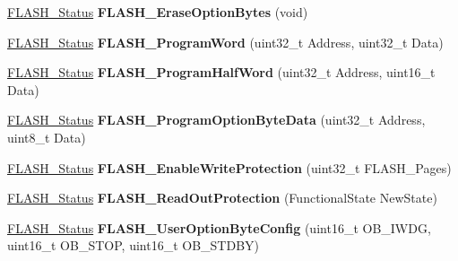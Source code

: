 \begin{DoxyCompactItemize}
\item 
\hypertarget{group__FLASH__Exported__Functions_ga152768609e85d74a9d8474be8dc2874b}{
\hyperlink{group__FLASH__Exported__Types_gadc63a6f3404ff1f71229a66915e9cdc0}{FLASH\_\-Status} {\bfseries FLASH\_\-EraseOptionBytes} (void)}
\label{group__FLASH__Exported__Functions_ga152768609e85d74a9d8474be8dc2874b}

\item 
\hypertarget{group__FLASH__Exported__Functions_gaac9a2f400b92537bd42a6bd7cc237b11}{
\hyperlink{group__FLASH__Exported__Types_gadc63a6f3404ff1f71229a66915e9cdc0}{FLASH\_\-Status} {\bfseries FLASH\_\-ProgramWord} (uint32\_\-t Address, uint32\_\-t Data)}
\label{group__FLASH__Exported__Functions_gaac9a2f400b92537bd42a6bd7cc237b11}

\item 
\hypertarget{group__FLASH__Exported__Functions_ga5c1336f667950a8765887228f1d0d501}{
\hyperlink{group__FLASH__Exported__Types_gadc63a6f3404ff1f71229a66915e9cdc0}{FLASH\_\-Status} {\bfseries FLASH\_\-ProgramHalfWord} (uint32\_\-t Address, uint16\_\-t Data)}
\label{group__FLASH__Exported__Functions_ga5c1336f667950a8765887228f1d0d501}

\item 
\hypertarget{group__FLASH__Exported__Functions_ga1382ff9d4ded8a5c076fde4fff529d21}{
\hyperlink{group__FLASH__Exported__Types_gadc63a6f3404ff1f71229a66915e9cdc0}{FLASH\_\-Status} {\bfseries FLASH\_\-ProgramOptionByteData} (uint32\_\-t Address, uint8\_\-t Data)}
\label{group__FLASH__Exported__Functions_ga1382ff9d4ded8a5c076fde4fff529d21}

\item 
\hypertarget{group__FLASH__Exported__Functions_gabad10c15e2d1ff1cb9e1083d08a9e763}{
\hyperlink{group__FLASH__Exported__Types_gadc63a6f3404ff1f71229a66915e9cdc0}{FLASH\_\-Status} {\bfseries FLASH\_\-EnableWriteProtection} (uint32\_\-t FLASH\_\-Pages)}
\label{group__FLASH__Exported__Functions_gabad10c15e2d1ff1cb9e1083d08a9e763}

\item 
\hypertarget{group__FLASH__Exported__Functions_ga0b8d1a8277950c890bbc247bbeafb40f}{
\hyperlink{group__FLASH__Exported__Types_gadc63a6f3404ff1f71229a66915e9cdc0}{FLASH\_\-Status} {\bfseries FLASH\_\-ReadOutProtection} (FunctionalState NewState)}
\label{group__FLASH__Exported__Functions_ga0b8d1a8277950c890bbc247bbeafb40f}

\item 
\hypertarget{group__FLASH__Exported__Functions_gaae1c493bb06c930ceb84dedfdb7325f6}{
\hyperlink{group__FLASH__Exported__Types_gadc63a6f3404ff1f71229a66915e9cdc0}{FLASH\_\-Status} {\bfseries FLASH\_\-UserOptionByteConfig} (uint16\_\-t OB\_\-IWDG, uint16\_\-t OB\_\-STOP, uint16\_\-t OB\_\-STDBY)}
\label{group__FLASH__Exported__Functions_gaae1c493bb06c930ceb84dedfdb7325f6}


\end{DoxyCompactItemize}
